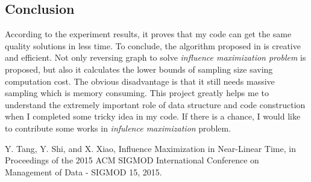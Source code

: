 \documentclass[conference,compsoc]{IEEEtran}
\begin{document}
\subsection{Conclusion}
According to the experiment results, it proves that my code can get the same quality solutions in less time. To conclude, the algorithm proposed in \cite{IMM} is creative and efficient. Not only reversing graph to solve \textit{influence maximization problem} is proposed, but also it calculates the lower bounds of sampling size saving computation cost. The obvious disadvantage is that it still needs massive sampling which is memory consuming. This project greatly helps me to understand the extremely important role of data structure and code construction when I completed some tricky idea in my code. If there is a chance, I would like to contribute some works in \textit{infulence maximization} problem. 











%
%
\begin{thebibliography}{1}
Y. Tang, Y. Shi, and X. Xiao, Influence Maximization in Near-Linear
Time, in Proceedings of the 2015 ACM SIGMOD International Conference on Management of Data - SIGMOD 15, 2015.
\end{thebibliography}





\end{document}
